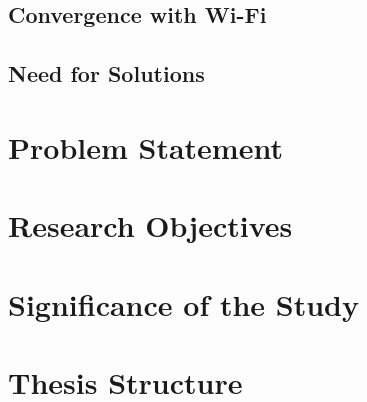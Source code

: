 \subsection{Convergence with Wi-Fi}


\subsection{Need for Solutions}


\section{Problem Statement}


\section{Research Objectives}


\section{Significance of the Study}


\section{Thesis Structure}

